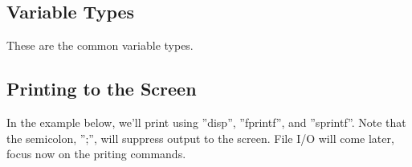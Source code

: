 \pagebreak
\subsection{Variable Types}
These are the common variable types.

\begin{quote}

\end{quote}

\pagebreak
\subsection{Printing to the Screen}
In the example below, we'll print using
 ''disp'',
 ''fprintf'',
 and ''sprintf''.
 Note that the semicolon, '';'', will suppress output to the screen.
 File I/O will come later, focus now on the priting commands.
\begin{quote}

\end{quote}